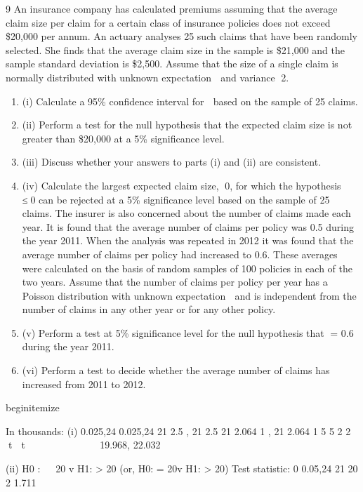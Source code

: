 \documentclass[a4paper,12pt]{article}
\begin{document}
9 An insurance company has calculated premiums assuming that the average claim size per claim for a certain class of insurance policies does not exceed \$20,000 per annum.
An actuary analyses 25 such claims that have been randomly selected. She finds that the average claim size in the sample is \$21,000 and the sample standard deviation is
\$2,500. Assume that the size of a single claim is normally distributed with unknown expectation  and variance 2.
\begin{enumerate}
\item (i) Calculate a 95\%  confidence interval for  based on the sample of 25 claims.

\item (ii) Perform a test for the null hypothesis that the expected claim size is not greater
than \$20,000 at a 5\% significance level. 
\item (iii) Discuss whether your answers to parts (i) and (ii) are consistent. 
\item (iv) Calculate the largest expected claim size, 0, for which the hypothesis  ≤0
can be rejected at a 5\% significance level based on the sample of 25 claims. 
The insurer is also concerned about the number of claims made each year. It is found that the average number of claims per policy was 0.5 during the year 2011. When the
analysis was repeated in 2012 it was found that the average number of claims per policy had increased to 0.6. These averages were calculated on the basis of random
samples of 100 policies in each of the two years. Assume that the number of claims per policy per year has a Poisson distribution with unknown expectation  and is
independent from the number of claims in any other year or for any other policy. 
\item (v) Perform a test at 5\% significance level for the null hypothesis that = 0.6
during the year 2011. 
\item (vi) Perform a test to decide whether the average number of claims has increased
from 2011 to 2012. 
\end{enumerate}
begin{itemize}
\item In thousands:
  (i) 0.025,24 0.025,24
21 2.5 , 21 2.5 21 2.064 1 , 21 2.064 1
5 5 2 2
 t  t          
19.968, 22.032
\item (ii) H0 :   20 v H1: \alpha > 20
(or, H0: \alpha = 20v H1: \alpha > 20)
Test statistic: 0
0.05,24
21 20 2 1.711
\end{document}
